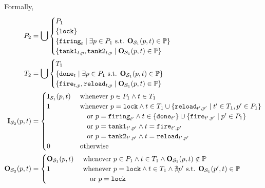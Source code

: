 Formally,
\begin{align*}
  \places_2 &= \bigcup \begin{cases}
      \places_1 \\
      \{ \mathtt{lock} \} \\
      \setComp{\mathtt{firing}_t}{\exists p \in \places_1 \text{ s.t. } \outm[\namePPN[1]][p,t] \in \parameters} \\
      \setComp{\mathtt{tank1}_{t,p}, \mathtt{tank2}_{t,p}}{\outm[\namePPN[1]][p,t] \in \parameters}
    \end{cases}\\
  \transitions_2 &= \bigcup \begin{cases}
      \transitions_1 \\
      \setComp{\mathtt{done}_t}{\exists p \in \places_1 \text{ s.t. } \outm[\namePPN[1]][p,t] \in \parameters} \\
      \setComp{\mathtt{fire}_{t,p}, \mathtt{reload}_{t,p}}{\outm[\namePPN[1]][p,t] \in \parameters}
    \end{cases}\\
  \inm[\namePPN[2]][p,t] &= \begin{cases}
      \inm[\namePPN[1]][p,t] &\text{ whenever } p \in \places_1 \wedge t \in \transitions_1 \\
      1 &\text{ whenever } p = \mathtt{lock}
          \wedge t \in \transitions_1 \cup \setComp{ \mathtt{reload}_{t',p'}}{t' \in \transitions_1, p' \in \places_1}\\
        &\quad\text{ or } p = \mathtt{firing}_{t'}
          \wedge t \in \{\mathtt{done}_{t'}\} \cup \setComp{\mathtt{fire}_{t',p'}}{p' \in \places_1} \\
        &\quad\text{ or } p = \mathtt{tank1}_{t',p'} \wedge t = \mathtt{fire}_{t',p'} \\
        &\quad\text{ or } p = \mathtt{tank2}_{t',p'} \wedge t = \mathtt{reload}_{t',p'} \\
      0 &\text{ otherwise }
    \end{cases} \\
  \outm[\namePPN[2]][p,t] &= \begin{cases}
      \outm[\namePPN[1]][p,t] &\text{ whenever } p \in \places_1 \wedge t \in \transitions_1 \wedge \outm[\namePPN[1]][p,t] \notin \parameters \\
      1 &\text{ whenever } p = \mathtt{lock}
          \wedge t \in \transitions_1 \wedge \nexists p' \text{ s.t. } \outm[\namePPN[1]][p',t] \in \parameters \\
        &\quad\text{ or } p = \mathtt{lock}

\end{cases}
\end{align*}
